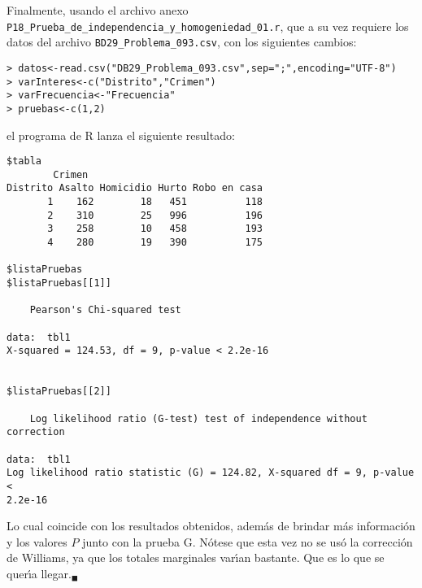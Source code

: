 \begin{solucion}
 Finalmente, usando el archivo anexo
 \texttt{P18\_Prueba\_de\_independencia\_y\_homogeniedad\_01.r},
 que a su vez requiere los datos del archivo
 \texttt{BD29\_Problema\_093.csv}, con los siguientes cambios:
 \begin{verbatim}
> datos<-read.csv("DB29_Problema_093.csv",sep=";",encoding="UTF-8")
> varInteres<-c("Distrito","Crimen")
> varFrecuencia<-"Frecuencia"
> pruebas<-c(1,2)
 \end{verbatim}
 \vspace{-0.5cm}
 el programa de R lanza el siguiente resultado:
 \begin{verbatim}
$tabla
        Crimen
Distrito Asalto Homicidio Hurto Robo en casa
       1    162        18   451          118
       2    310        25   996          196
       3    258        10   458          193
       4    280        19   390          175

$listaPruebas
$listaPruebas[[1]]

	Pearson's Chi-squared test

data:  tbl1
X-squared = 124.53, df = 9, p-value < 2.2e-16


$listaPruebas[[2]]

	Log likelihood ratio (G-test) test of independence without correction

data:  tbl1
Log likelihood ratio statistic (G) = 124.82, X-squared df = 9, p-value <
2.2e-16
 \end{verbatim}
 \vspace{-0.5cm}
 Lo cual coincide con los resultados obtenidos, adem\'as de brindar m\'as
 informaci\'on y los valores $P$ junto con la prueba G.
 N\'otese que esta vez no se us\'o la correcci\'on de Williams,
 ya que los totales marginales var\'{\i}an bastante.
 Que es lo que se quer\'{\i}a llegar.${}_{\blacksquare}$
\end{solucion}
